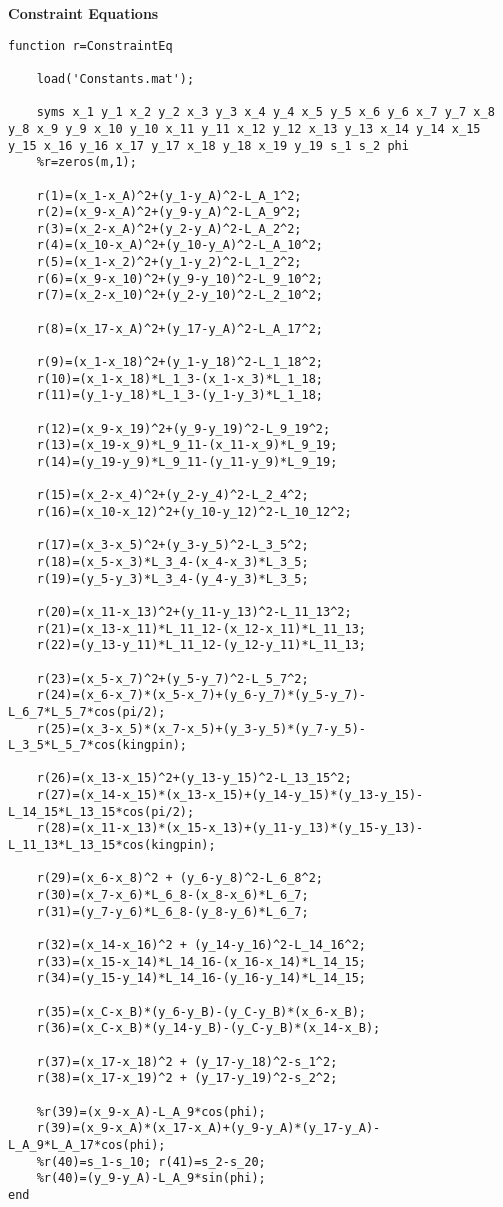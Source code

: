 \newpage
\textbf{Constraint Equations}
\begin{lstlisting}[style=codematlab]
function r=ConstraintEq

    load('Constants.mat'); 
    
    syms x_1 y_1 x_2 y_2 x_3 y_3 x_4 y_4 x_5 y_5 x_6 y_6 x_7 y_7 x_8 y_8 x_9 y_9 x_10 y_10 x_11 y_11 x_12 y_12 x_13 y_13 x_14 y_14 x_15 y_15 x_16 y_16 x_17 y_17 x_18 y_18 x_19 y_19 s_1 s_2 phi    
    %r=zeros(m,1);
    
    r(1)=(x_1-x_A)^2+(y_1-y_A)^2-L_A_1^2;
    r(2)=(x_9-x_A)^2+(y_9-y_A)^2-L_A_9^2;
    r(3)=(x_2-x_A)^2+(y_2-y_A)^2-L_A_2^2;
    r(4)=(x_10-x_A)^2+(y_10-y_A)^2-L_A_10^2;
    r(5)=(x_1-x_2)^2+(y_1-y_2)^2-L_1_2^2;
    r(6)=(x_9-x_10)^2+(y_9-y_10)^2-L_9_10^2;
    r(7)=(x_2-x_10)^2+(y_2-y_10)^2-L_2_10^2;
    
    r(8)=(x_17-x_A)^2+(y_17-y_A)^2-L_A_17^2;
    
    r(9)=(x_1-x_18)^2+(y_1-y_18)^2-L_1_18^2;
    r(10)=(x_1-x_18)*L_1_3-(x_1-x_3)*L_1_18;
    r(11)=(y_1-y_18)*L_1_3-(y_1-y_3)*L_1_18;
    
    r(12)=(x_9-x_19)^2+(y_9-y_19)^2-L_9_19^2;
    r(13)=(x_19-x_9)*L_9_11-(x_11-x_9)*L_9_19;
    r(14)=(y_19-y_9)*L_9_11-(y_11-y_9)*L_9_19;
    
    r(15)=(x_2-x_4)^2+(y_2-y_4)^2-L_2_4^2;
    r(16)=(x_10-x_12)^2+(y_10-y_12)^2-L_10_12^2;
    
    r(17)=(x_3-x_5)^2+(y_3-y_5)^2-L_3_5^2;
    r(18)=(x_5-x_3)*L_3_4-(x_4-x_3)*L_3_5;
    r(19)=(y_5-y_3)*L_3_4-(y_4-y_3)*L_3_5;
    
    r(20)=(x_11-x_13)^2+(y_11-y_13)^2-L_11_13^2;
    r(21)=(x_13-x_11)*L_11_12-(x_12-x_11)*L_11_13;
    r(22)=(y_13-y_11)*L_11_12-(y_12-y_11)*L_11_13;
    
    r(23)=(x_5-x_7)^2+(y_5-y_7)^2-L_5_7^2;
    r(24)=(x_6-x_7)*(x_5-x_7)+(y_6-y_7)*(y_5-y_7)-L_6_7*L_5_7*cos(pi/2);
    r(25)=(x_3-x_5)*(x_7-x_5)+(y_3-y_5)*(y_7-y_5)-L_3_5*L_5_7*cos(kingpin);
    
    r(26)=(x_13-x_15)^2+(y_13-y_15)^2-L_13_15^2;
    r(27)=(x_14-x_15)*(x_13-x_15)+(y_14-y_15)*(y_13-y_15)-L_14_15*L_13_15*cos(pi/2);
    r(28)=(x_11-x_13)*(x_15-x_13)+(y_11-y_13)*(y_15-y_13)-L_11_13*L_13_15*cos(kingpin);
    
    r(29)=(x_6-x_8)^2 + (y_6-y_8)^2-L_6_8^2;
    r(30)=(x_7-x_6)*L_6_8-(x_8-x_6)*L_6_7;
    r(31)=(y_7-y_6)*L_6_8-(y_8-y_6)*L_6_7;
    
    r(32)=(x_14-x_16)^2 + (y_14-y_16)^2-L_14_16^2;
    r(33)=(x_15-x_14)*L_14_16-(x_16-x_14)*L_14_15;
    r(34)=(y_15-y_14)*L_14_16-(y_16-y_14)*L_14_15;
    
    r(35)=(x_C-x_B)*(y_6-y_B)-(y_C-y_B)*(x_6-x_B);
    r(36)=(x_C-x_B)*(y_14-y_B)-(y_C-y_B)*(x_14-x_B);
    
    r(37)=(x_17-x_18)^2 + (y_17-y_18)^2-s_1^2;
    r(38)=(x_17-x_19)^2 + (y_17-y_19)^2-s_2^2;
    
    %r(39)=(x_9-x_A)-L_A_9*cos(phi);
    r(39)=(x_9-x_A)*(x_17-x_A)+(y_9-y_A)*(y_17-y_A)-L_A_9*L_A_17*cos(phi);
    %r(40)=s_1-s_10; r(41)=s_2-s_20;
    %r(40)=(y_9-y_A)-L_A_9*sin(phi);
end
    
    
    
\end{lstlisting}

